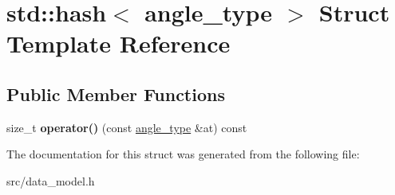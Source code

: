 \hypertarget{structstd_1_1hash_3_01angle__type_01_4}{}\section{std\+:\+:hash$<$ angle\+\_\+type $>$ Struct Template Reference}
\label{structstd_1_1hash_3_01angle__type_01_4}
\subsection*{Public Member Functions}
\begin{DoxyCompactItemize}
\item 
\mbox{\label{structstd_1_1hash_3_01angle__type_01_4_a7057058e8815eaaee739fe49d1e76d58}} 
size\+\_\+t {\bfseries operator()} (const \hyperlink{structangle__type}{angle\+\_\+type} \&at) const
\end{DoxyCompactItemize}


The documentation for this struct was generated from the following file\+:\begin{DoxyCompactItemize}
\item 
src/data\+\_\+model.\+h\end{DoxyCompactItemize}
